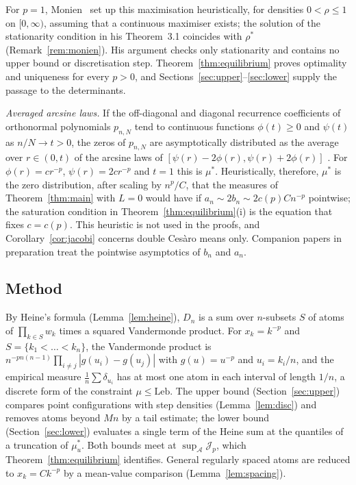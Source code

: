 \documentclass{amsart}
\theoremstyle{definition}
\theoremstyle{remark}
\numberwithin{equation}{section}
\newcommand{\cA}{\mathcal{A}}
\newcommand{\cJ}{\mathcal{J}}
\newcommand{\Leb}{\mathrm{Leb}}
\begin{document}
For $p=1$, Monien~\cite[\S3]{Monien} set up this maximisation heuristically, for densities $0<\rho\le1$ on
$[0,\infty)$, assuming that a continuous maximiser exists; the solution of the stationarity condition in his
Theorem~3.1 coincides with $\rho^*$ (Remark~\ref{rem:monien}). His argument checks only stationarity and contains no
upper bound or discretisation step. Theorem~\ref{thm:equilibrium} proves optimality and uniqueness for every $p>0$,
and Sections~\ref{sec:upper}--\ref{sec:lower} supply the passage to the determinants.

\emph{Averaged arcsine laws.} If the off-diagonal and diagonal recurrence coefficients of orthonormal polynomials
$p_{n,N}$ tend to continuous functions $\phi(t)\ge0$ and $\psi(t)$ as $n/N\to t>0$, the zeros of $p_{n,N}$ are
asymptotically distributed as the average over $r\in(0,t)$ of the arcsine laws of
$[\psi(r)-2\phi(r),\psi(r)+2\phi(r)]$ \cite[Thm.~1.4]{KVA-JAT}. For $\phi(r)=cr^{-p}$, $\psi(r)=2cr^{-p}$ and $t=1$
this is $\mu^*$. Heuristically, therefore, $\mu^*$ is the zero distribution, after scaling by $n^p/C$, that the
measures of Theorem~\ref{thm:main} with $L=0$ would have if $a_n\sim2b_n\sim2c(p)Cn^{-p}$ pointwise; the saturation condition in
Theorem~\ref{thm:equilibrium}(i) is the equation that fixes $c=c(p)$. This heuristic is not used in the
proofs, and Corollary~\ref{cor:jacobi} concerns double Ces\`aro means only. Companion papers in preparation treat
the pointwise asymptotics of $b_n$ and $a_n$.

\subsection{Method}
By Heine's formula (Lemma~\ref{lem:heine}), $D_n$ is a sum over $n$-subsets $S$ of atoms of
$\prod_{k\in S}w_k$ times a squared Vandermonde product. For $x_k=k^{-p}$ and $S=\{k_1<\dots<k_n\}$, the Vandermonde
product is $n^{-pn(n-1)}\prod_{i\ne j}|g(u_i)-g(u_j)|$ with $g(u)=u^{-p}$ and $u_i=k_i/n$, and the empirical measure
$\frac1n\sum\delta_{u_i}$ has at most one atom in each interval of length $1/n$, a discrete form of the constraint
$\mu\le\Leb$. The upper bound (Section~\ref{sec:upper}) compares point configurations with step densities
(Lemma~\ref{lem:disc}) and removes atoms beyond $Mn$ by a tail estimate; the lower bound
(Section~\ref{sec:lower}) evaluates a single term of the Heine sum at the quantiles of a truncation of $\mu^*_u$. Both
bounds meet at $\sup_\cA\cJ_p$, which Theorem~\ref{thm:equilibrium} identifies. General regularly spaced atoms are
reduced to $x_k=Ck^{-p}$ by a mean-value comparison (Lemma~\ref{lem:spacing}).
\end{document}
